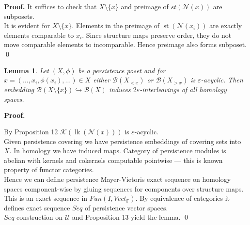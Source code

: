 \documentclass[a4paper, 12pt]{article}
\newtheorem{lemma}{Lemma}
\theoremstyle{definition}
\theoremstyle{remark}
\newenvironment{pf}{\noindent\textbf{Proof.}}{\qed}
\begin{document}
\begin{pf}
  It suffices to check that $X \setminus \{x\}$ and preimage of $st(\mathcal{N}(x))$ are subposets.\\

  It is evident for $X \setminus \{x\}$. Elements in the preimage of $\operatorname{st}(\mathcal{N}(x_i))$ are exactly elements comparable to $x_i$. Since structure maps preserve order, they do not move comparable elements to incomparable. Hence preimage also forms subposet.
\end{pf}\\

\begin{lemma}
  Let $(X,\phi)$ be a persistence poset and for $x=(\ldots,x_i,\phi(x_i),\ldots) \in X$ either $\mathcal{B}(X_{< x})$ or $\mathcal{B}(X_{> x})$ is $\varepsilon$-acyclic. Then embedding $\mathcal{B}(X \setminus \{x\}) \hookrightarrow \mathcal{B}(X)$ induces $2\varepsilon$-interleavings of all homology spaces.
\end{lemma}

\begin{pf} ~ \par
  By Proposition 12 $\mathcal{K}(\operatorname{lk}(\mathcal{N}(x)))$ is $\varepsilon$-acyclic.\\

  Given persistence covering we have persistence embeddings of covering sets into $X$. In homology we have induced maps. Category of persistence modules is abelian with kernels and cokernels computable pointwise --- this is known property of functor categories.\\

  Hence we can define persistence Mayer-Vietoris exact sequence on homology spaces component-wise by gluing sequences for components over structure maps. This is an exact sequence in $Fun(I,Vect_{\mathbb{F}})$. By equivalence of categories it defines exact sequence $Seq$ of persistence vector spaces.\\

  $Seq$ construction on $\mathcal{U}$ and Proposition 13 yield the lemma.
\end{pf}
\end{document}
